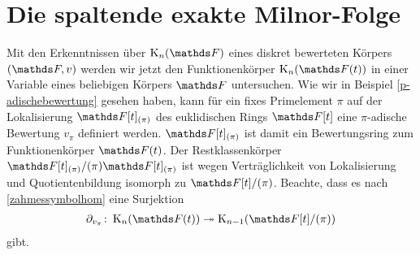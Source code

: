 \documentclass[ngerman,fontsize=11pt, paper=a4, parskip=half, titlepage=true, toc=bib]{scrartcl}
\begin{document}



\section{Die spaltende exakte Milnor-Folge}

Mit den Erkenntnissen über $\KnF$ eines diskret bewerteten 
Körpers $(\F,v)$ werden wir jetzt den Funktionenkörper $\KnFt$ 
in einer Variable eines beliebigen Körpers $\F$ untersuchen. 
Wie wir in Beispiel \ref{p-adischebewertung} gesehen haben, 
kann für ein fixes Primelement $\pi$ auf der Lokalisierung 
$\F[t]_{(\pi)}$ des euklidischen Rings $\F[t]$ eine $\pi$-adische
Bewertung $v_\pi$ definiert werden. $\F[t]_{(\pi)}$ ist damit ein
Bewertungsring zum Funktionenkörper $\Ft $.
Der Restklassenkörper $\F[t]_{(\pi)}/(\pi)\F[t]_{(\pi)}$ ist wegen
Verträglichkeit von Lokalisierung und Quotientenbildung isomorph zu
$\F[t]/(\pi)$.
Beachte, dass es nach \ref{zahmessymbolhom} eine Surjektion
\begin{gather*}
  \partial_{v_\pi}\colon \KnFt\twoheadrightarrow \K_{n-1}(\Ftpi)
\end{gather*}
gibt.
\end{document}
